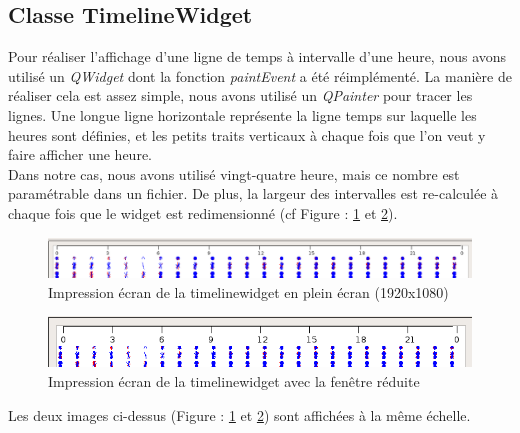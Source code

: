 \documentclass[12pt]{article}
\begin{document}
		\subsection{Classe TimelineWidget}
		Pour réaliser l’affichage d’une ligne de temps à intervalle d’une heure, nous avons utilisé un \textit{QWidget} dont la fonction \textit{paintEvent} a été réimplémenté. La manière de réaliser cela est assez simple, nous avons utilisé un \textit{QPainter} pour tracer les lignes. Une longue ligne horizontale représente la ligne temps sur laquelle les heures sont définies, et les petits traits verticaux à chaque fois que l’on veut y faire afficher une heure.\\
Dans notre cas, nous avons utilisé vingt-quatre heure, mais ce nombre est paramétrable dans un fichier. De plus, la largeur des intervalles est re-calculée à  chaque fois que le widget est redimensionné
(cf Figure : \ref{fig:timeline_widget_1} et \ref{fig:timeline_widget_2}).


\clearpage
		\begin{figure}[!h]
		\begin{center}
		\includegraphics[scale=.4]{timeline_widget_1.png}
		\caption{Impression écran de la timelinewidget en plein écran (1920x1080)}
		\label{fig:timeline_widget_1}
		\end{center}
		\end{figure}
		
		\begin{figure}[!h]
		\begin{center}
		\includegraphics[scale=.4]{timeline_widget_2.png}
		\caption{Impression écran de la timelinewidget avec la fenêtre réduite}
		\label{fig:timeline_widget_2}
		\end{center}
		\end{figure}
		
		Les deux images ci-dessus (Figure : \ref{fig:timeline_widget_1} et \ref{fig:timeline_widget_2})
		sont affichées à la même échelle.
	
		
\end{document}
